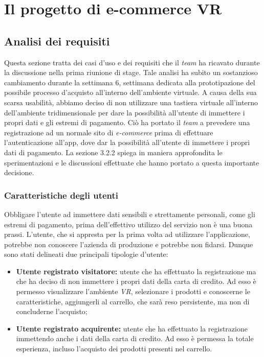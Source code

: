 \chapter{Il progetto di e-commerce VR}
\label{cap:ilprogettoe-commercevr}

\section{Analisi dei requisiti}

Questa sezione tratta dei casi d'uso e dei requisiti che il \textit{team} ha ricavato durante la discussione nella prima riunione di stage. Tale analisi ha subito un sostanzioso cambiamento durante la settimana 6, settimana dedicata alla prototipazione del possibile processo d'acquisto all'interno dell'ambiente virtuale. A causa della sua scarsa usabilità, abbiamo deciso di non utilizzare una tastiera virtuale all'interno dell'ambiente tridimensionale per dare la possibilità all'utente di immettere i propri dati e gli estremi di pagamento. Ciò ha portato il \textit{team} a prevedere una registrazione ad un normale sito di \textit{e-commerce} prima di effettuare l'autenticazione all'app, dove dar la possibilità all'utente di immettere i propri dati di pagamento. La sezione 3.2.2 spiega in maniera approfondita le sperimentazioni e le discussioni effettuate che hanno portato a questa importante decisione. 


\subsection{Caratteristiche degli utenti}

Obbligare l'utente ad immettere dati sensibili e strettamente personali, come gli estremi di pagamento, prima dell'effettivo utilizzo del servizio non è una buona prassi. L'utente, che si appresta per la prima volta ad utilizzare l'applicazione, potrebbe non conoscere l'azienda di produzione e potrebbe non fidarsi. Dunque sono stati delineati due principali tipologie d'utente:

\begin{itemize}
	\item \textbf{Utente registrato visitatore:} utente che ha effettuato la registrazione ma che ha deciso di non immettere i propri dati della carta di credito. Ad esso è permesso visualizzare l'ambiente \textit{VR}, selezionare i prodotti e conoscerne le caratteristiche, aggiungerli al carrello, che sarà reso persistente, ma non di concluderne l'acquisto;
	\item \textbf{Utente registrato acquirente:} utente che ha effettuato la registrazione immettendo anche i dati della carta di credito. Ad esso è permessa la totale esperienza, incluso l'acquisto dei prodotti presenti nel carrello.
\end{itemize}

